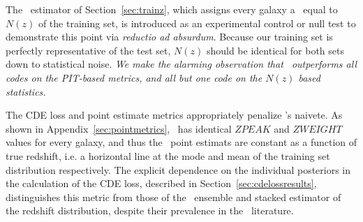 The \trainz\ estimator of Section~\ref{sec:trainz}, which assigns every galaxy a \pzpdf\ equal to $N(z)$ of the training set, is introduced as an experimental control or null test to demonstrate this point via \textit{reductio ad absurdum}.
Because our training set is perfectly representative of the test set, $N(z)$ should be identical for both sets down to statistical noise.
\textit{We make the alarming observation that \trainz\ outperforms all codes on the PIT-based metrics, and all but one code on the $N(z)$ based statistics.}

The CDE loss and point estimate metrics appropriately penalize \trainz's naivete.
As shown in Appendix~\ref{sec:pointmetrics}, \trainz ~has identical $ZPEAK$ and $ZWEIGHT$ values for every galaxy, and thus the \pz\ point estimats are constant as a function of true redshift, i.e. a horizontal line at the mode and mean of the training set distribution respectively.
The explicit dependence on the individual posteriors in the calculation of the CDE loss, described in Section~\ref{sec:cdelossresults}, distinguishes this metric from those of the \pzpdf\ ensemble and stacked estimator of the redshift distribution, despite their prevalence in the \pz\ literature.

